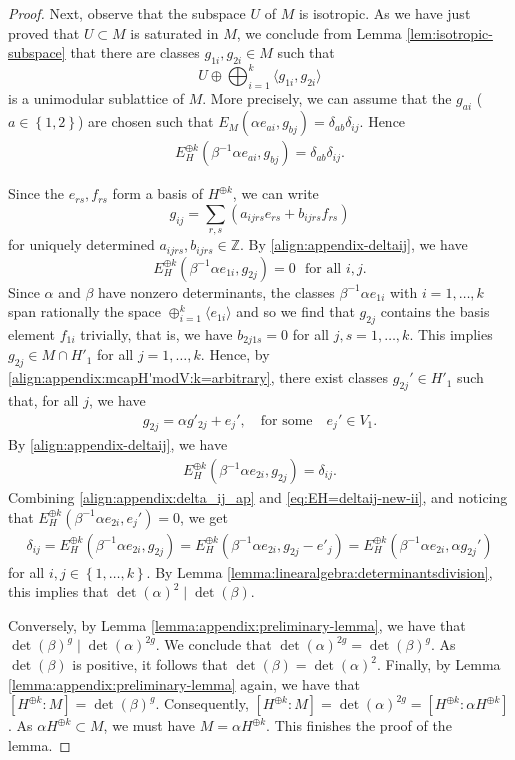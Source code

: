 \documentclass[a4paper,11pt,reqno]{amsart}
\numberwithin{equation}{section}
\theoremstyle{plain}
\theoremstyle{definition}
\newcommand{\Z}{\mathbb Z}
\newcommand{\set}[1]{\left\{ #1 \right\}}
\begin{document}
\begin{proof}
Next, observe that the subspace $U$ of $M$ is isotropic. As we have just proved that $U \subset M$ is saturated in $M$, we conclude from Lemma \ref{lem:isotropic-subspace} that there are classes
$
g_{1i},g_{2i}\in M
$
such that
$$
 U \oplus \bigoplus_{i=1}^k \langle g_{1i},g_{2i} \rangle 
$$
is a unimodular sublattice of $M$.
More precisely, we can assume that the $g_{ai}$ ($a \in \set{1,2}$) are chosen such that
$
E_M(\alpha e_{ai}, g_{bj})=\delta_{ab}\delta_{ij} . 
$
Hence
\begin{align} \label{align:appendix-deltaij}
E_H^{\oplus k}(\beta^{-1}\alpha e_{ai}, g_{bj})=\delta_{ab}\delta_{ij} . 
\end{align}


Since the $e_{rs},f_{rs}$ form a basis of $H^{\oplus k}$, we can write
$$
g_{ij}=\sum_{r,s} \left(a_{ijrs}e_{rs}+b_{ijrs}f_{rs} \right) 
$$
for uniquely determined $a_{ijrs},b_{ijrs} \in \Z$.
By \eqref{align:appendix-deltaij}, we have 
$$
E_H^{\oplus k}(\beta^{-1}\alpha e_{1i}, g_{2j})=0\ \ \ \text{for all $i,j$.}
$$   
Since $\alpha$ and $\beta$ have nonzero determinants, the classes $\beta^{-1}\alpha e_{1i}$ with $i=1,\dots ,k$ span rationally the space $\oplus_{i=1}^k\langle e_{1i}\rangle $ and so we find that $g_{2j}$ contains the basis element $f_{1i}$ trivially, that is, we have $b_{2j1s}=0$ for all $j,s=1,\dots,k$. This implies 
$
g_{2j}\in M\cap H'_1$ for all $j = 1, \dotsc, k$. Hence, by \eqref{align:appendix:mcapH'modV:k=arbitrary}, there exist 
classes $g_{2j}'\in H'_1$ such that, for all $j$, we have 
\begin{align} \label{align:appendix:delta_ij_ap}
g_{2j}=\alpha g'_{2j} + e_j', \quad  \text{for some} \quad e_j'  \in V_1. 
\end{align}
By \eqref{align:appendix-deltaij}, we have
\begin{align}\label{eq:EH=deltaij-new-ii}
E_H^{\oplus k}(\beta^{-1}\alpha e_{2i},g_{2j})= \delta_{ij} .
\end{align}
Combining \eqref{align:appendix:delta_ij_ap} and \eqref{eq:EH=deltaij-new-ii}, and noticing that $E_H^{\oplus k}(\beta^{-1}\alpha e_{2i}, e_j') = 0$, 
we get
\begin{align*}
\delta_{ij} = E_H^{\oplus k}(\beta^{-1}\alpha e_{2i},g_{2j}) = 
E_H^{\oplus k}(\beta^{-1}\alpha e_{2i},g_{2j} - e'_j)= 
E_H^{\oplus k}(\beta^{-1}\alpha e_{2i}, \alpha g_{2j}'
)
\end{align*}
for all $i,j \in \set{1, \dotsc, k}$. 
By Lemma \ref{lemma:linearalgebra:determinantsdivision}, this implies that $\det(\alpha)^2 \mid \det(\beta)$. 

Conversely, by Lemma \ref{lemma:appendix:preliminary-lemma}, we have that $\det(\beta)^g  
 \mid \det(\alpha)^{2g}$. We conclude that $\det(\alpha)^{2g} = \det(\beta)^g$. As $\det(\beta)$ is positive, it follows that $\det(\beta) = \det(\alpha)^2$. Finally, by Lemma \ref{lemma:appendix:preliminary-lemma} again, we have that $[H^{\oplus k} \colon M] = \det(\beta)^g$. Consequently, $[H^{\oplus k} \colon M] = \det(\alpha)^{2g} = [H^{\oplus k} \colon \alpha H^{\oplus k}]$. As $\alpha H^{\oplus k} \subset M$, we must have $M = \alpha H^{\oplus k}$. This finishes the proof of the lemma. 
\end{proof}
\end{document}
